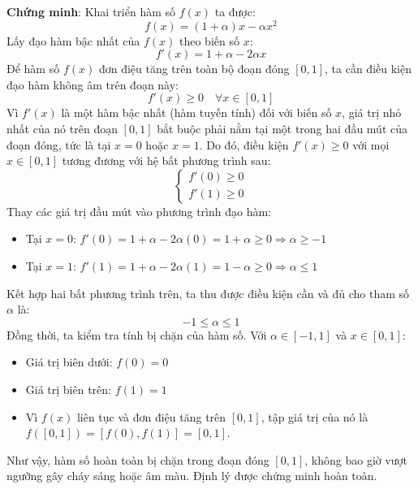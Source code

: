 \documentclass[a4paper]{article}
\begin{document}
\noindent \textbf{Chứng minh}:
Khai triển hàm số $f(x)$ ta được:
\begin{equation}
    f(x) = (1 + \alpha)x - \alpha x^2
\end{equation}
Lấy đạo hàm bậc nhất của $f(x)$ theo biến số $x$:
\begin{equation}
    f'(x) = 1 + \alpha - 2\alpha x
\end{equation}
Để hàm số $f(x)$ đơn điệu tăng trên toàn bộ đoạn đóng $[0, 1]$, ta cần điều kiện đạo hàm không âm trên đoạn này:
\begin{equation}
    f'(x) \geq 0 \quad \forall x \in [0, 1]
\end{equation}
Vì $f'(x)$ là một hàm bậc nhất (hàm tuyến tính) đối với biến số $x$, giá trị nhỏ nhất của nó trên đoạn $[0, 1]$ bắt buộc phải nằm tại một trong hai đầu mút của đoạn đóng, tức là tại $x = 0$ hoặc $x = 1$.
Do đó, điều kiện $f'(x) \geq 0$ với mọi $x \in [0, 1]$ tương đương với hệ bất phương trình sau:
\begin{equation}
    \begin{cases}
        f'(0) \geq 0 \\
        f'(1) \geq 0
    \end{cases}
\end{equation}
Thay các giá trị đầu mút vào phương trình đạo hàm:
\begin{itemize}
    \item Tại $x = 0$: $f'(0) = 1 + \alpha - 2\alpha(0) = 1 + \alpha \geq 0 \Longrightarrow \alpha \geq -1$
    \item Tại $x = 1$: $f'(1) = 1 + \alpha - 2\alpha(1) = 1 - \alpha \geq 0 \Longrightarrow \alpha \leq 1$
\end{itemize}
Kết hợp hai bất phương trình trên, ta thu được điều kiện cần và đủ cho tham số $\alpha$ là:
\begin{equation}
    -1 \leq \alpha \leq 1
\end{equation}
Đồng thời, ta kiểm tra tính bị chặn của hàm số. Với $\alpha \in [-1, 1]$ và $x \in [0, 1]$:
\begin{itemize}
    \item Giá trị biên dưới: $f(0) = 0$
    \item Giá trị biên trên: $f(1) = 1$
    \item Vì $f(x)$ liên tục và đơn điệu tăng trên $[0, 1]$, tập giá trị của nó là $f([0, 1]) = [f(0), f(1)] = [0, 1]$.
\end{itemize}
Như vậy, hàm số hoàn toàn bị chặn trong đoạn đóng $[0, 1]$, không bao giờ vượt ngưỡng gây cháy sáng hoặc âm màu. Định lý được chứng minh hoàn toàn.
\end{document}
